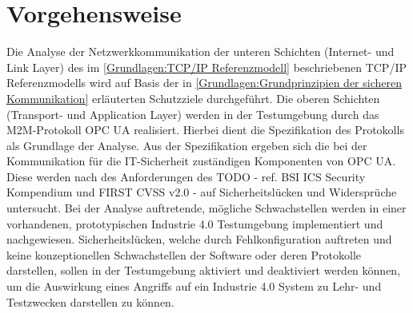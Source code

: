\section{Vorgehensweise}
Die Analyse der Netzwerkkommunikation der unteren Schichten (Internet- und Link Layer) des im \autoref{Grundlagen:TCP/IP Referenzmodell} beschriebenen TCP/IP Referenzmodells wird auf Basis der in \autoref{Grundlagen:Grundprinzipien der sicheren Kommunikation} erläuterten Schutzziele durchgeführt. Die oberen Schichten (Transport- und Application Layer) werden in der Testumgebung durch das \ac{M2M}-Protokoll \ac{OPC UA} realisiert. Hierbei dient die Spezifikation des Protokolls als Grundlage der Analyse. Aus der Spezifikation ergeben sich die bei der Kommunikation für die IT-Sicherheit zuständigen Komponenten von \ac{OPC UA}. Diese werden nach des Anforderungen des TODO - ref. BSI ICS Security Kompendium und FIRST CVSS v2.0 - auf Sicherheitslücken und Widersprüche untersucht. Bei der Analyse auftretende, mögliche Schwachstellen werden in einer vorhandenen, prototypischen Industrie 4.0 Testumgebung \cite{Weber2018} implementiert und nachgewiesen. Sicherheitslücken, welche durch Fehlkonfiguration auftreten und keine konzeptionellen Schwachstellen der Software oder deren Protokolle darstellen, sollen in der Testumgebung aktiviert und deaktiviert werden können, um die Auswirkung eines Angriffs auf ein Industrie 4.0 System zu Lehr- und Testzwecken darstellen zu können.